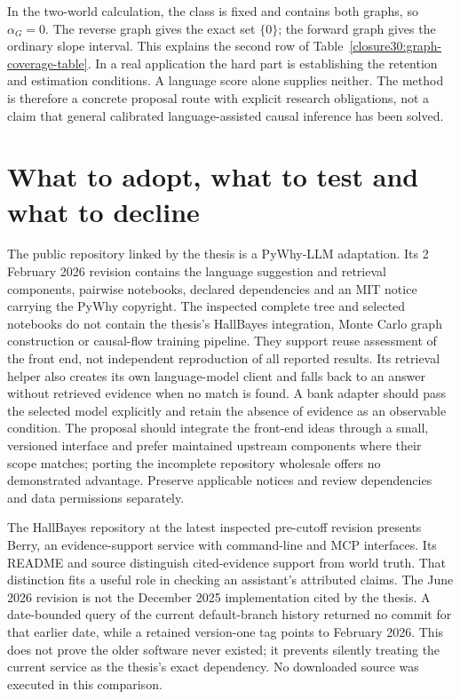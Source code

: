 In the two-world calculation, the class is fixed and contains both graphs,
so $\alpha_G=0$. The reverse graph gives the exact set $\{0\}$; the forward
graph gives the ordinary slope interval. This explains the second row of
Table~\ref{closure30:graph-coverage-table}. In a real application the hard
part is establishing the retention and estimation conditions. A language
score alone supplies neither. The method is therefore a concrete proposal
route with explicit research obligations, not a claim that general calibrated
language-assisted causal inference has been solved.

\section{What to adopt, what to test and what to decline}

The public repository linked by the thesis is a PyWhy-LLM adaptation. Its
2 February 2026 revision contains the language suggestion and retrieval
components, pairwise notebooks, declared dependencies and an MIT notice
carrying the PyWhy copyright. The inspected complete tree and selected
notebooks do not contain the thesis's HallBayes integration, Monte Carlo
graph construction or causal-flow training pipeline. They support reuse
assessment of the front end, not independent reproduction of all reported
results. Its retrieval helper also creates its own language-model client and
falls back to an answer without retrieved evidence when no match is found.
A bank adapter should pass the selected model explicitly and retain the
absence of evidence as an observable condition. The proposal should
integrate the front-end ideas through a small,
versioned interface and prefer maintained upstream components where their
scope matches; porting the incomplete repository wholesale offers no
demonstrated advantage. Preserve applicable notices and review dependencies
and data permissions separately.
\citep{closure30molerocode}

The HallBayes repository at the latest inspected pre-cutoff revision presents
Berry, an evidence-support service with command-line and MCP interfaces.
Its README and source distinguish cited-evidence support from world truth.
That distinction fits a useful role in checking an assistant's attributed
claims. The June 2026 revision is not the December 2025 implementation cited
by the thesis. A date-bounded query of the current default-branch history
returned no commit for that earlier date, while a retained version-one tag
points to February 2026. This does not prove the older software never
existed; it prevents silently treating the current service as the thesis's
exact dependency. No downloaded source was executed in this comparison.
\citep{closure30berry}

